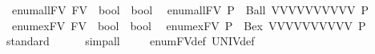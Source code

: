 \begin{isabellebody}
\isanewline
{}\isamarkupfalse%
\ enum{\isacharunderscore}{\kern0pt}all{\isacharunderscore}{\kern0pt}FV{\isacharcolon}{\kern0pt}{\isacharcolon}{\kern0pt}\ {\isachardoublequoteopen}{\isacharparenleft}{\kern0pt}FV\ {\isasymRightarrow}\ bool{\isacharparenright}{\kern0pt}\ {\isasymRightarrow}\ bool\ {\isachardoublequoteclose}\isanewline
{}\ {\isachardoublequoteopen}enum{\isacharunderscore}{\kern0pt}all{\isacharunderscore}{\kern0pt}FV\ P\ {\isacharequal}{\kern0pt}\ Ball\ {\isacharbraceleft}{\kern0pt}V{}{\isacharcomma}{\kern0pt}V{}{\isacharcomma}{\kern0pt}V{}{\isacharcomma}{\kern0pt}V{}{\isacharcomma}{\kern0pt}V{}{\isacharcomma}{\kern0pt}V{}{\isacharcomma}{\kern0pt}V{}{\isacharcomma}{\kern0pt}V{}{\isacharcomma}{\kern0pt}V{}{\isacharcomma}{\kern0pt}V{}{}{\isacharbraceright}{\kern0pt}\ P{\isachardoublequoteclose}\isanewline
\isanewline
{}\isamarkupfalse%
\ enum{\isacharunderscore}{\kern0pt}ex{\isacharunderscore}{\kern0pt}FV{\isacharcolon}{\kern0pt}{\isacharcolon}{\kern0pt}\ {\isachardoublequoteopen}{\isacharparenleft}{\kern0pt}FV\ {\isasymRightarrow}\ bool{\isacharparenright}{\kern0pt}\ {\isasymRightarrow}\ bool\ {\isachardoublequoteclose}\isanewline
{}\ {\isachardoublequoteopen}enum{\isacharunderscore}{\kern0pt}ex{\isacharunderscore}{\kern0pt}FV\ P\ {\isacharequal}{\kern0pt}\ Bex\ {\isacharbraceleft}{\kern0pt}V{}{\isacharcomma}{\kern0pt}V{}{\isacharcomma}{\kern0pt}V{}{\isacharcomma}{\kern0pt}V{}{\isacharcomma}{\kern0pt}V{}{\isacharcomma}{\kern0pt}V{}{\isacharcomma}{\kern0pt}V{}{\isacharcomma}{\kern0pt}V{}{\isacharcomma}{\kern0pt}V{}{\isacharcomma}{\kern0pt}V{}{}{\isacharbraceright}{\kern0pt}\ P{\isachardoublequoteclose}\isanewline
\ \ \isanewline
{}\isamarkupfalse%
\ \isanewline
%
\isadelimproof
\ \ %
\endisadelimproof
%
\isatagproof
{}\isamarkupfalse%
{\isacharparenleft}{\kern0pt}standard{\isacharparenright}{\kern0pt}\isanewline
\ \ \ \ \ \isamarkupfalse%
{\isacharparenleft}{\kern0pt}simp{\isacharunderscore}{\kern0pt}all{\isacharparenright}{\kern0pt}\ \isanewline
\ \ \isamarkupfalse%
\ enum{\isacharunderscore}{\kern0pt}FV{\isacharunderscore}{\kern0pt}def\ UNIV{\isacharunderscore}{\kern0pt}def\ \isanewline
{}\isamarkupfalse%
\ {\isacharminus}{\kern0pt}\isanewline

\end{isabellebody}
